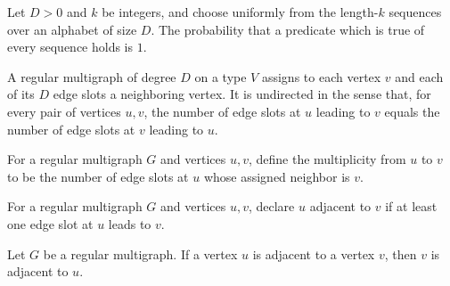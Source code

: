 \begin{theorem}
\label{Randomized.idxProb_true}
\leanok
{}
Let $D>0$ and $k$ be integers, and choose uniformly from the length-$k$ sequences over
an alphabet of size $D$. The probability that a predicate which is true of every
sequence holds is $1$.
\end{theorem}

\begin{definition}
\label{Randomized.RegularMultigraph}
\leanok
A regular multigraph of degree $D$ on a type $V$ assigns to each vertex $v$ and each of
its $D$ edge slots a neighboring vertex. It is undirected in the sense that, for every
pair of vertices $u,v$, the number of edge slots at $u$ leading to $v$ equals the number
of edge slots at $v$ leading to $u$.
\end{definition}

\begin{definition}
\label{Randomized.RegularMultigraph.mult}
\leanok
For a regular multigraph $G$ and vertices $u,v$, define the multiplicity from $u$ to $v$
to be the number of edge slots at $u$ whose assigned neighbor is $v$.
\end{definition}

\begin{definition}
\label{Randomized.RegularMultigraph.Adj}
\leanok
For a regular multigraph $G$ and vertices $u,v$, declare $u$ adjacent to $v$ if at least
one edge slot at $u$ leads to $v$.
\end{definition}

\begin{theorem}
\label{Randomized.RegularMultigraph.adj_symm}
\leanok
{}
Let $G$ be a regular multigraph. If a vertex $u$ is adjacent to a vertex $v$, then $v$
is adjacent to $u$.
\end{theorem}

